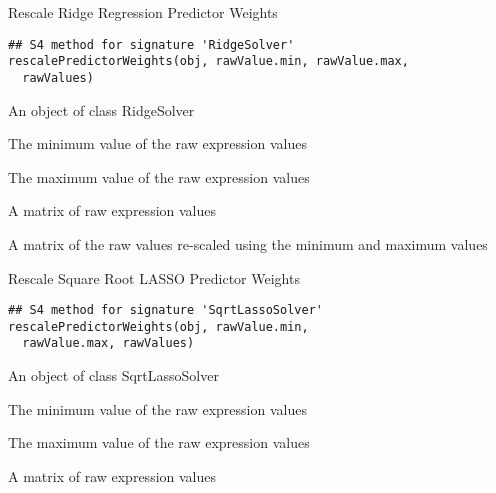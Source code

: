 \documentclass[a4paper]{book}
\begin{document}
%
\begin{Description}\relax
Rescale Ridge Regression Predictor Weights
\end{Description}
%
\begin{Usage}
\begin{verbatim}
## S4 method for signature 'RidgeSolver'
rescalePredictorWeights(obj, rawValue.min, rawValue.max,
  rawValues)
\end{verbatim}
\end{Usage}
%
\begin{Arguments}
\begin{ldescription}
\item[\code{obj}] An object of class RidgeSolver

\item[\code{rawValue.min}] The minimum value of the raw expression values

\item[\code{rawValue.max}] The maximum value of the raw expression values

\item[\code{rawValues}] A matrix of raw expression values
\end{ldescription}
\end{Arguments}
%
\begin{Value}
A matrix of the raw values re-scaled using the minimum and maximum values
\end{Value}
%
\begin{Description}\relax
Rescale Square Root LASSO Predictor Weights
\end{Description}
%
\begin{Usage}
\begin{verbatim}
## S4 method for signature 'SqrtLassoSolver'
rescalePredictorWeights(obj, rawValue.min,
  rawValue.max, rawValues)
\end{verbatim}
\end{Usage}
%
\begin{Arguments}
\begin{ldescription}
\item[\code{obj}] An object of class SqrtLassoSolver

\item[\code{rawValue.min}] The minimum value of the raw expression values

\item[\code{rawValue.max}] The maximum value of the raw expression values

\item[\code{rawValues}] A matrix of raw expression values
\end{ldescription}
\end{Arguments}
\end{document}
